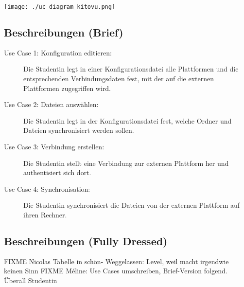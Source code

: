 \documentclass[a4paper]{article}
\begin{document}
\texttt{[image: ./uc\_diagram\_kitovu.png]}

\subsection{Beschreibungen (Brief)}
\begin{description}
	
\item[Use Case 1: Konfiguration editieren:] Die Studentin legt in einer Konfigurationsdatei alle Plattformen und die entsprechenden Verbindungsdaten fest, mit der auf die externen Plattformen zugegriffen wird.

\item[Use Case 2: Dateien auswählen:] Die Studentin legt in der Konfigurationsdatei fest, welche Ordner und Dateien synchronisiert werden sollen.

\item[Use Case 3: Verbindung erstellen:] Die Studentin stellt eine Verbindung zur externen Plattform her und authentisiert sich dort.

\item[Use Case 4: Synchronisation:] Die Studentin synchronisiert die Dateien von der externen Plattform auf ihren Rechner.
\end{description}

\pagebreak
\subsection{Beschreibungen (Fully Dressed)}

FIXME Nicolas Tabelle in schön- Weggelassen: Level, weil macht irgendwie keinen Sinn
FIXME Méline: Use Cases umschreiben, Brief-Version folgend. Überall Studentin
\end{document}
